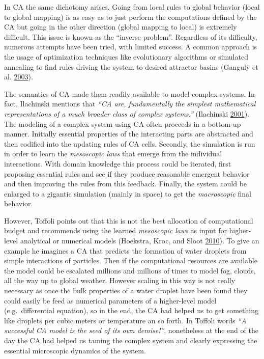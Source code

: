 \documentclass[
  12pt,
  openany]{book}
\begin{document}
In CA the same dichotomy arises. Going from local rules to global behavior (local to global mapping) is as easy as to just perform the computations defined by the CA but going in the other direction (global mapping to local) is extremely difficult. This issue is known as the ``inverse problem''. Regardless of its difficulty, numerous attempts have been tried, with limited success. A common approach is the usage of optimization techniques like evolutionary algorithms or simulated annealing to find rules driving the system to desired attractor basins (Ganguly et al. \protect\hyperlink{ref-ganguly2003survey}{2003}).

The semantics of CA made them readily available to model complex systems. In fact, Ilachinski mentions that \emph{``CA are, fundamentally the simplest mathematical representations of a much broader class of complex systems.''} (Ilachinski \protect\hyperlink{ref-ilachinski2001cellular}{2001}). The modeling of a complex system using CA often proceeds in a bottom-up manner. Initially essential properties of the interacting parts are abstracted and then codified into the updating rules of CA cells. Secondly, the simulation is run in order to learn the \emph{mesoscopic laws} that emerge from the individual interactions. With domain knowledge this process could be iterated, first proposing essential rules and see if they produce reasonable emergent behavior and then improving the rules from this feedback. Finally, the system could be enlarged to a gigantic simulation (mainly in space) to get the \emph{macroscopic} final behavior.

However, Toffoli points out that this is not the best allocation of computational budget and recommends using the learned \emph{mesoscopic laws} as input for higher-level analytical or numerical models (Hoekstra, Kroc, and Sloot \protect\hyperlink{ref-hoekstra2010simulating}{2010}). To give an example he imagines a CA that predicts the formation of water droplets from simple interactions of particles. Then if the computational resources are available the model could be escalated millions and millions of times to model fog, clouds, all the way up to global weather. However scaling in this way is not really necessary as once the bulk properties of a water droplet have been found they could easily be feed as numerical parameters of a higher-level model (e.g.~differential equation), so in the end, the CA had helped us to get something like droplets per cubic meters or temperature an so forth. In Toffoli words \emph{``A successful CA model is the seed of its own demise!''}, nonetheless at the end of the day the CA had helped us taming the complex system and clearly expressing the essential microscopic dynamics of the system.
\end{document}

